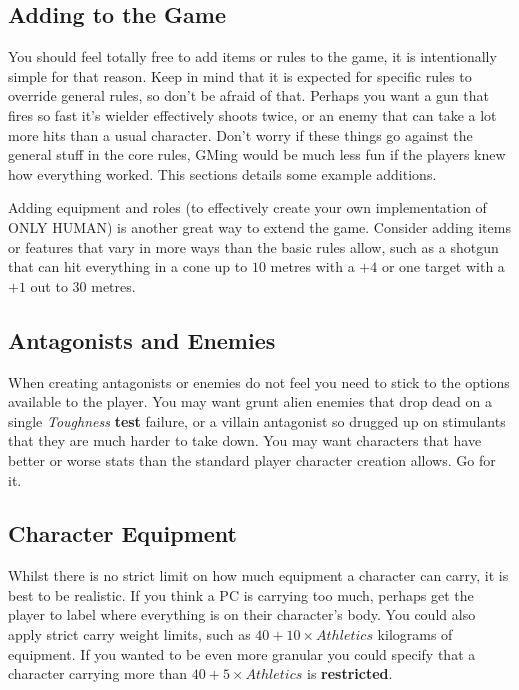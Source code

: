 \documentclass[11pt]{article}
\begin{document}
\begin{multicols}{3}
  \subsection*{Adding to the Game}

  You should feel totally free to add items or rules to the game, it is
  intentionally simple for that reason. Keep in mind that it is expected for
  specific rules to override general rules, so don't be afraid of that. Perhaps
  you want a gun that fires so fast it's wielder effectively shoots twice, or an
  enemy that can take a lot more hits than a usual character. Don't worry if
  these things go against the general stuff in the core rules, GMing would be
  much less fun if the players knew how everything worked. This sections details
  some example additions.

  Adding equipment and roles (to effectively create your own implementation of
  ONLY HUMAN) is another great way to extend the game. Consider adding items or
  features that vary in more ways than the basic rules allow, such as a shotgun
  that can hit everything in a cone up to $10$ metres with a $+4$ or one target
  with a $+1$ out to $30$ metres.

  \subsection*{Antagonists and Enemies}

  When creating antagonists or enemies do not feel you need to stick to the
  options available to the player. You may want grunt alien enemies that drop
  dead on a single \textit{Toughness} \textbf{test} failure, or a villain
  antagonist so drugged up on stimulants that they are much harder to take down.
  You may want characters that have better or worse stats than the standard
  player character creation allows. Go for it.

  \subsection*{Character Equipment}

  Whilst there is no strict limit on how much equipment a character can carry,
  it is best to be realistic. If you think a PC is carrying too much, perhaps
  get the player to label where everything is on their character's body. You
  could also apply strict carry weight limits, such as $40 + 10 \times
  Athletics$ kilograms of equipment. If you wanted to be even more granular you
  could specify that a character carrying more than $40 + 5 \times Athletics$
  is \textbf{restricted}.


\end{multicols}
\end{document}
